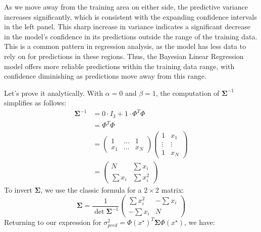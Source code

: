 As we move away from the training area on either side, the predictive variance increases significantly, which is consistent with the expanding confidence intervals in the left panel. This sharp increase in variance indicates a significant decrease in the model's confidence in its predictions outside the range of the training data. This is a common pattern in regression analysis, as the model has less data to rely on for predictions in these regions. Thus, the Bayesian Linear Regression model offers more reliable predictions within the training data range, with confidence diminishing as predictions move away from this range.\newline

\noindent Let's prove it analytically. With $\alpha = 0$ and $\beta = 1$, the computation of $\boldsymbol{\Sigma}^{-1}$ simplifies as follows:
\begin{align*}
    \boldsymbol{\Sigma}^{-1} 
        &= 0 \cdot I_3 + 1 \cdot \Phi^T \Phi \\
        &= \Phi^T \Phi \\ 
        &= \begin{pmatrix}
            1 & \dots & 1 \\
            x_1 & \dots & x_N
        \end{pmatrix} 
        \begin{pmatrix}
            1 & x_1 \\
            \vdots & \vdots \\
            1 & x_N 
        \end{pmatrix} \\
        &= \begin{pmatrix}
            N & \sum x_i \\
            \sum x_i & \sum x_i^2
        \end{pmatrix}
\end{align*}
To invert $\boldsymbol{\Sigma}$, we use the classic formula for a $2 \times 2$ matrix:
\[
    \boldsymbol{\Sigma} = \frac{1}{\det \boldsymbol{\Sigma}^{-1}} \begin{pmatrix}
        \sum x_i^2 & - \sum x_i \\
        - \sum x_i & N
    \end{pmatrix}
\]
Returning to our expression for $ \sigma^2_{pred} = \Phi (x^\star ) ^T \boldsymbol{\Sigma} \Phi (x^\star )$, we have:
